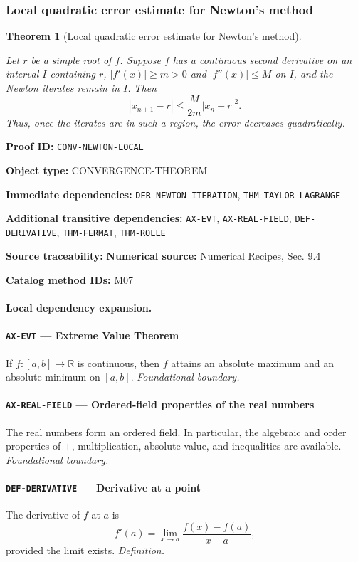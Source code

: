 \documentclass[10pt]{article}
\newcommand{\pidraw}[1]{\begingroup\urlstyle{tt}\nolinkurl{#1}\endgroup}
\newtheorem{theorem}{Theorem}[section]
\theoremstyle{definition}
\theoremstyle{remark}
\newcommand{\meta}[2]{\noindent\textbf{#1:} #2\par}
\begin{document}
\subsubsection{Local quadratic error estimate for Newton's method}

\begin{theorem}[Local quadratic error estimate for Newton's method]\label{prf:CONV-NEWTON-LOCAL}

Let $r$ be a simple root of $f$. Suppose $f$ has a continuous second derivative on an interval $I$ containing $r$, $|f'(x)|\ge m>0$ and $|f''(x)|\le M$ on $I$, and the Newton iterates remain in $I$. Then
\[
|x_{n+1}-r|\le \frac{M}{2m}|x_n-r|^2.
\]
Thus, once the iterates are in such a region, the error decreases quadratically.

\end{theorem}

\meta{Proof ID}{\pidraw{CONV-NEWTON-LOCAL}}
\meta{Object type}{CONVERGENCE-THEOREM}
\meta{Immediate dependencies}{\pidraw{DER-NEWTON-ITERATION}, \pidraw{THM-TAYLOR-LAGRANGE}}
\meta{Additional transitive dependencies}{\pidraw{AX-EVT}, \pidraw{AX-REAL-FIELD}, \pidraw{DEF-DERIVATIVE}, \pidraw{THM-FERMAT}, \pidraw{THM-ROLLE}}
\meta{Source traceability}{\textbf{Numerical source:} Numerical Recipes, Sec. 9.4}
\meta{Catalog method IDs}{M07}

\paragraph{Local dependency expansion.}

\paragraph{\pidraw{AX-EVT} --- Extreme Value Theorem}
If $f:[a,b]\to\mathbb{R}$ is continuous, then $f$ attains an absolute maximum and an absolute minimum on $[a,b]$.
\textit{Foundational boundary.}

\paragraph{\pidraw{AX-REAL-FIELD} --- Ordered-field properties of the real numbers}
The real numbers form an ordered field. In particular, the algebraic and order properties of $+$, multiplication, absolute value, and inequalities are available.
\textit{Foundational boundary.}

\paragraph{\pidraw{DEF-DERIVATIVE} --- Derivative at a point}
The derivative of $f$ at $a$ is
\[
f'(a)=\lim_{x\to a}\frac{f(x)-f(a)}{x-a},
\]
provided the limit exists.
\textit{Definition.}
\end{document}
